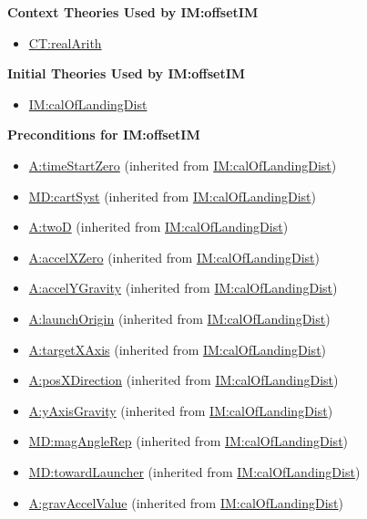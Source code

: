 \documentclass[12pt]{article}
\begin{document}
\noindent \textbf{Context Theories Used by IM:offsetIM}

\begin{itemize}
\item \hyperref[CT:realArith]{CT:realArith}
\end{itemize}

\noindent \textbf{Initial Theories Used by IM:offsetIM}

\begin{itemize}
\item \hyperref[IM:calOfLandingDist]{IM:calOfLandingDist}
\end{itemize}

\noindent \textbf{Preconditions for IM:offsetIM}
\begin{itemize}
\item \hyperref[timeStartZero]{A:timeStartZero} (inherited from \hyperref[IM:calOfLandingDist]{IM:calOfLandingDist})
\item \hyperref[MD:cartSyst]{MD:cartSyst} (inherited from \hyperref[IM:calOfLandingDist]{IM:calOfLandingDist})
\item \hyperref[twoD]{A:twoD} (inherited from \hyperref[IM:calOfLandingDist]{IM:calOfLandingDist})
\item \hyperref[accelXZero]{A:accelXZero} (inherited from \hyperref[IM:calOfLandingDist]{IM:calOfLandingDist})
\item \hyperref[accelYGravity]{A:accelYGravity} (inherited from \hyperref[IM:calOfLandingDist]{IM:calOfLandingDist})
\item \hyperref[launchOrigin]{A:launchOrigin} (inherited from \hyperref[IM:calOfLandingDist]{IM:calOfLandingDist})
\item \hyperref[targetXAxis]{A:targetXAxis} (inherited from \hyperref[IM:calOfLandingDist]{IM:calOfLandingDist})
\item \hyperref[posXDirection]{A:posXDirection} (inherited from \hyperref[IM:calOfLandingDist]{IM:calOfLandingDist})
\item \hyperref[yAxisGravity]{A:yAxisGravity} (inherited from \hyperref[PIM:calOfLandingDist]{IM:calOfLandingDist})
\item \hyperref[MD:magAngleRep]{MD:magAngleRep} (inherited from \hyperref[IM:calOfLandingDist]{IM:calOfLandingDist})
\item \hyperref[MD:towardLauncher]{MD:towardLauncher} (inherited from \hyperref[IM:calOfLandingDist]{IM:calOfLandingDist})
\item \hyperref[gravAccelValue]{A:gravAccelValue} (inherited from \hyperref[IM:calOfLandingDist]{IM:calOfLandingDist})

\end{itemize}
\end{document}
